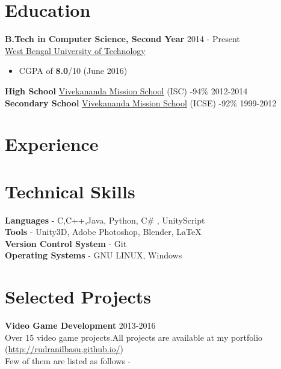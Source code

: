 \documentclass[margin, centered]{res}
\begin{document}
\begin{resume}

\section{Education}
\textbf{B.Tech in Computer Science, Second Year} \hfill 2014 - Present\\
\href{http://www.wbut.ac.in/}{West Bengal University of Technology}

\begin{itemize}
 \item CGPA of \textbf{8.0}/10 (June 2016)
\end{itemize}
\textbf{High School} \href{http://www.vmskolkata.org/}{Vivekananda Mission School} (ISC) -94\% \hfill 2012-2014\\
\textbf{Secondary School} \href{http://www.vmskolkata.org/}{Vivekananda Mission School} (ICSE) -92\% \hfill 1999-2012

\section{Experience}

\section{Technical Skills}
\textbf{Languages} - C,C++,Java, Python, C\# , UnityScript \\
\textbf{Tools} - Unity3D, Adobe Photoshop, Blender, \LaTeX \\
\textbf{Version Control System} - Git \\
\textbf{Operating Systems} - GNU LINUX, Windows
\section{Selected Projects}
\textbf{Video Game Development} \hfill 2013-2016\\
Over 15 video game projects.All projects are available at my portfolio (\href{http://rudranilbasu.github.io/}{http://rudranilbasu.github.io/})\\
Few of them are listed as follows - 


\end{resume}
\end{document}
